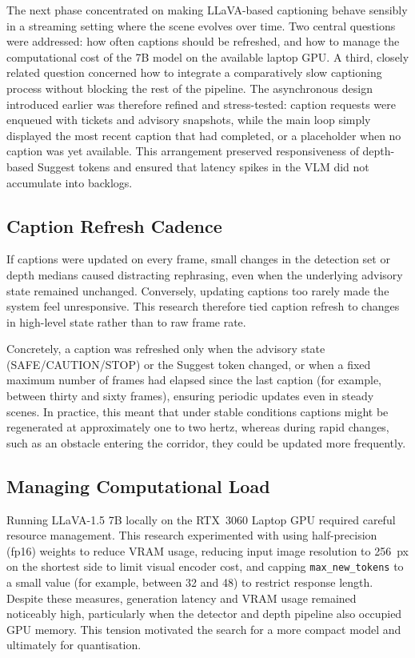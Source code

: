\documentclass[11pt,a4paper]{article}
\newcommand{\code}[1]{\texttt{#1}}
\begin{document}
The next phase concentrated on making LLaVA-based captioning behave sensibly in a streaming setting where the scene evolves over time. Two central questions were addressed: how often captions should be refreshed, and how to manage the computational cost of the 7B model on the available laptop GPU. A third, closely related question concerned how to integrate a comparatively slow captioning process without blocking the rest of the pipeline. The asynchronous design introduced earlier was therefore refined and stress-tested: caption requests were enqueued with tickets and advisory snapshots, while the main loop simply displayed the most recent caption that had completed, or a placeholder when no caption was yet available. This arrangement preserved responsiveness of depth-based Suggest tokens and ensured that latency spikes in the VLM did not accumulate into backlogs.

\subsection{Caption Refresh Cadence}

If captions were updated on every frame, small changes in the detection set or depth medians caused distracting rephrasing, even when the underlying advisory state remained unchanged. Conversely, updating captions too rarely made the system feel unresponsive. This research therefore tied caption refresh to changes in high-level state rather than to raw frame rate.

Concretely, a caption was refreshed only when the advisory state (SAFE/CAUTION/STOP) or the Suggest token changed, or when a fixed maximum number of frames had elapsed since the last caption (for example, between thirty and sixty frames), ensuring periodic updates even in steady scenes. In practice, this meant that under stable conditions captions might be regenerated at approximately one to two hertz, whereas during rapid changes, such as an obstacle entering the corridor, they could be updated more frequently.

\subsection{Managing Computational Load}

Running LLaVA-1.5 7B locally on the RTX~3060 Laptop GPU required careful resource management. This research experimented with using half-precision (fp16) weights to reduce VRAM usage, reducing input image resolution to 256~px on the shortest side to limit visual encoder cost, and capping \code{max\_new\_tokens} to a small value (for example, between 32 and 48) to restrict response length. Despite these measures, generation latency and VRAM usage remained noticeably high, particularly when the detector and depth pipeline also occupied GPU memory. This tension motivated the search for a more compact model and ultimately for quantisation.
\end{document}
